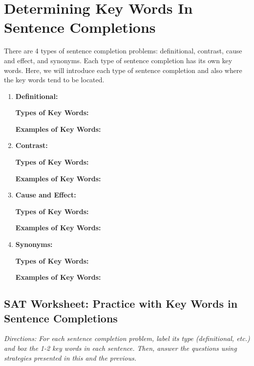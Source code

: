 \section{Determining Key Words In Sentence Completions}

There are 4 types of sentence completion problems: definitional, contrast, cause and effect, and
synonyms. Each type of sentence completion has its own key words. Here, we will introduce each
type of sentence completion and also where the key words tend to be located.

\begin{enumerate}
\item \textbf{Definitional:}

\textbf{Types of Key Words:}

\textbf{Examples of Key Words:}

\item \textbf{Contrast:}

\textbf{Types of Key Words:}

\textbf{Examples of Key Words:}

\item \textbf{Cause and Effect:}

\textbf{Types of Key Words:}

\textbf{Examples of Key Words:}

\item \textbf{Synonyms:}

\textbf{Types of Key Words:}

\textbf{Examples of Key Words:}

\end{enumerate} 

\subsection{SAT Worksheet: Practice with Key Words in Sentence Completions}

\textit{Directions: For each sentence completion problem, label its type (definitional, etc.) and box the
1-2 key words in each sentence. Then, answer the questions using strategies presented in this and
the previous.}